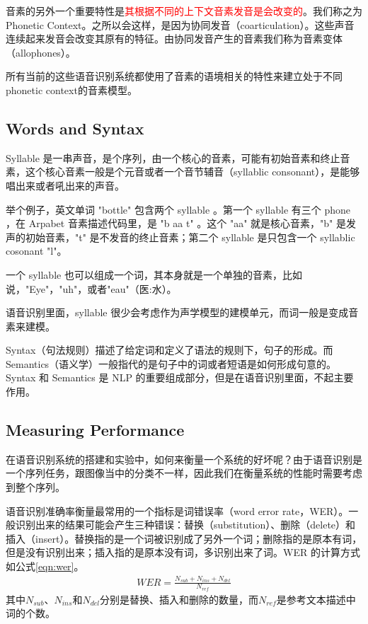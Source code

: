 音素的另外一个重要特性是\textcolor{red}{其根据不同的上下文音素发音是会改变的}。我们称之为Phonetic Context。之所以会这样，是因为协同发音（coarticulation）。这些声音连续起来发音会改变其原有的特征。由协同发音产生的音素我们称为音素变体（allophones）。

所有当前的这些语音识别系统都使用了音素的语境相关的特性来建立处于不同phonetic context的音素模型。

\subsection{Words and Syntax} %
\label{sub:words_and_syntax}
Syllable 是一串声音，是个序列，由一个核心的音素，可能有初始音素和终止音素，这个核心音素一般是个元音或者一个音节辅音（syllablic consonant），是能够唱出来或者吼出来的声音。

举个例子，英文单词 "bottle" 包含两个 syllable 。第一个 syllable 有三个 phone ，在 Arpabet 音素描述代码里，是 "b aa t" 。这个 "aa" 就是核心音素，"b" 是发声的初始音素，"t" 是不发音的终止音素；第二个 syllable 是只包含一个 syllablic cosonant "l"。

一个 syllable 也可以组成一个词，其本身就是一个单独的音素，比如说，"Eye"，"uh"，或者"eau"（医:水）。

语音识别里面，syllable 很少会考虑作为声学模型的建模单元，而词一般是变成音素来建模。

Syntax（句法规则）描述了给定词和定义了语法的规则下，句子的形成。而 Semantics（语义学）一般指代的是句子中的词或者短语是如何形成句意的。Syntax 和 Semantics 是 NLP 的重要组成部分，但是在语音识别里面，不起主要作用。

\subsection{Measuring Performance} %
\label{sub:measuring_performance}
在语音识别系统的搭建和实验中，如何来衡量一个系统的好坏呢？由于语音识别是一个序列任务，跟图像当中的分类不一样，因此我们在衡量系统的性能时需要考虑到整个序列。

语音识别准确率衡量最常用的一个指标是词错误率（word error rate，WER）。一般识别出来的结果可能会产生三种错误：替换（substitution）、删除（delete）和插入（insert）。替换指的是一个词被识别成了另外一个词；删除指的是原本有词，但是没有识别出来；插入指的是原本没有词，多识别出来了词。WER 的计算方式如公式\ref{eqn:wer}。
\begin{align}
\label{eqn:wer}
	WER = \frac{N_{sub}+N_{ins}+N_{del}}{N_{ref}}
\end{align}
其中$N_{sub}$、$N_{ins}$和$N_{del}$分别是替换、插入和删除的数量，而$N_{ref}$是参考文本描述中词的个数。

